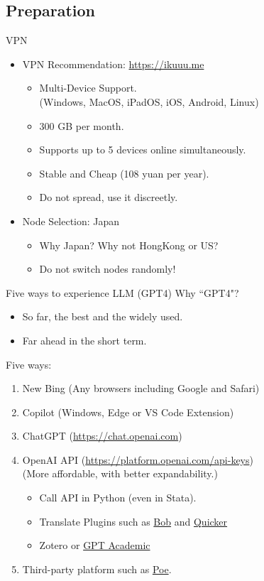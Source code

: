 \documentclass[UTF8, 16pt]{beamer}
\begin{document}
\begin{CJK*}{UTF8}{gbsn}
\section{Preparation}
\begin{frame}{VPN}
	\begin{itemize}
		\item VPN Recommendation: \href{https://ikuuu.me}{https://ikuuu.me}
			\begin{itemize}
				\item \alert{Multi-Device} Support.
					\\ (Windows, MacOS, iPadOS, iOS, Android, Linux)
				\item 300 GB per month.
				\item Supports up to 5 devices online simultaneously. 
				\item \alert{Stable and Cheap} (108 yuan per year).
				\item Do not spread, use it discreetly.
			\end{itemize}
		\item Node Selection: \alert{Japan}
			\begin{itemize}
				\item Why Japan? Why not HongKong or US?
				\item Do not switch nodes randomly!
			\end{itemize}
	\end{itemize}
\end{frame}
\begin{frame}{Five ways to experience LLM (GPT4)}
	Why ``GPT4"?
	\begin{itemize}
		\item So far, the best and the widely used.
		\item Far ahead in the short term.
	\end{itemize}
	Five ways:
	\begin{enumerate}
		\item New Bing (Any browsers including Google and Safari)
		\item Copilot (Windows, Edge or VS Code Extension)
		\item \alert{ChatGPT} (\href{https://chat.openai.com/}{https://chat.openai.com}) 
		\item OpenAI API (\href{https://platform.openai.com/api-keys}{https://platform.openai.com/api-keys})
			\\ (More affordable, with better expandability.)
			\begin{itemize}
				\item Call API in Python (even in Stata).
			\item Translate Plugins such as \href{https://bobtranslate.com}{Bob} and \href{https://getquicker.net/}{Quicker}
				\item Zotero or \href{https://github.com/binary-husky/gpt_academic}{GPT Academic}
			\end{itemize}
		\item Third-party platform such as \href{https://poe.com}{Poe}.
	\end{enumerate}
\end{frame}


\end{CJK*}
\end{document}
